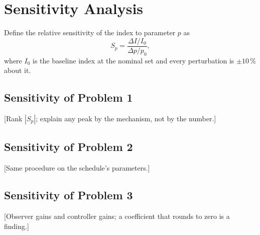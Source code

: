 \section{Sensitivity Analysis}

Define the relative sensitivity of the index to parameter $p$ as
\begin{equation}
  S_p = \frac{\Delta I / I_0}{\Delta p / p_0},
  \label{eq:sensitivity}
\end{equation}
where $I_0$ is the baseline index at the nominal set and every perturbation is
$\pm 10\,\%$ about it.

\subsection{Sensitivity of Problem 1}
[Rank $|S_p|$; explain any peak by the mechanism, not by the number.]

\subsection{Sensitivity of Problem 2}
[Same procedure on the schedule's parameters.]

\subsection{Sensitivity of Problem 3}
[Observer gains and controller gains; a coefficient that rounds to zero is a finding.]

